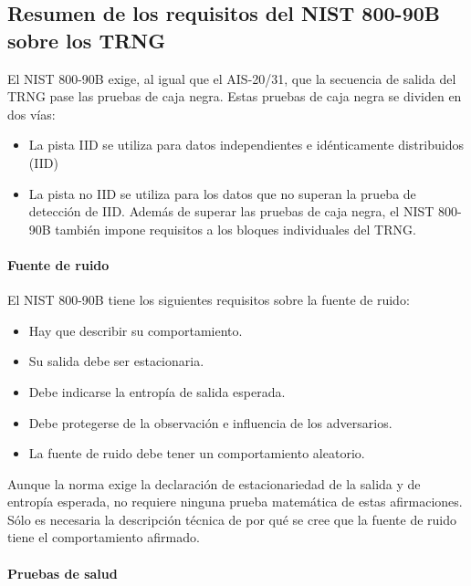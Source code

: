 		\subsection{Resumen de los requisitos del NIST 800-90B sobre los TRNG}
	
		El NIST 800-90B exige, al igual que el AIS-20/31, que la secuencia de salida del TRNG pase las pruebas de caja negra. Estas pruebas de caja negra se dividen en dos vías:
		
		\begin{itemize}[noitemsep]
			\item La pista IID se utiliza para datos independientes e idénticamente distribuidos (IID)
			\item La pista no IID se utiliza para los datos que no superan la prueba de detección de IID. Además de superar las pruebas de caja negra, el NIST 800-90B también impone requisitos a los bloques individuales del TRNG.
		\end{itemize}
		
		\paragraph{Fuente de ruido\\}
		
			El NIST 800-90B tiene los siguientes requisitos sobre la fuente de ruido:
			
		\begin{itemize}[noitemsep]
			\item Hay que describir su comportamiento.
			\item Su salida debe ser estacionaria.
			\item Debe indicarse la entropía de salida esperada.
			\item Debe protegerse de la observación e influencia de los adversarios.
			\item La fuente de ruido debe tener un comportamiento aleatorio.
		\end{itemize}
		
		Aunque la norma exige la declaración de estacionariedad de la salida y de entropía esperada, no requiere ninguna prueba matemática de estas afirmaciones. Sólo es necesaria la descripción técnica de por qué se cree que la fuente de ruido tiene el comportamiento afirmado.
		
		
		\paragraph{Pruebas de salud\\}
		
